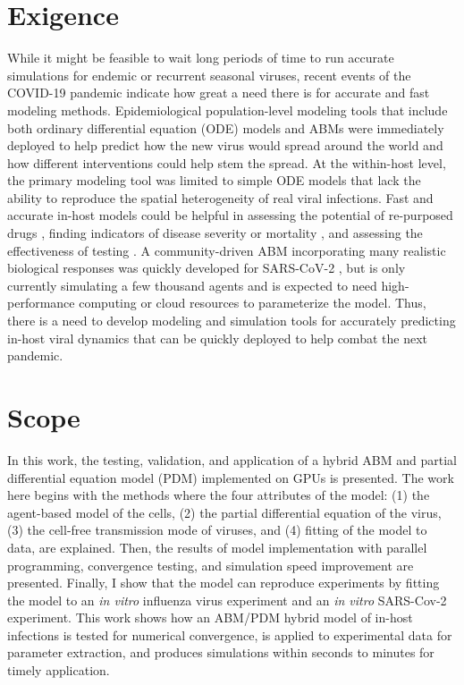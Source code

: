 \section{Exigence}
While it might be feasible to wait long periods of time to run accurate simulations for endemic or recurrent seasonal viruses, recent events of the COVID-19 pandemic indicate how great a need there is for accurate and fast modeling methods. Epidemiological population-level modeling tools that include both ordinary differential equation (ODE) models \citep{li20,ngonghala20} and ABMs \citep{ying21,sneppen21,kano21} were immediately deployed to help predict how the new virus would spread around the world and how different interventions could help stem the spread. At the within-host level, the primary modeling tool was limited to simple ODE models \citep{goncalves20,wang20model,hernandez20,dogra20} that lack the ability to reproduce the spatial heterogeneity of real viral infections. Fast and accurate in-host models could be helpful in assessing the potential of re-purposed drugs \citep{czuppon21,goncalves20,dodds20}, finding indicators of disease severity or mortality \citep{neant21}, and assessing the effectiveness of testing \citep{ejima21}. A community-driven ABM incorporating many realistic biological responses was quickly developed for SARS-CoV-2 \citep{getz21}, but is only currently simulating a few thousand agents and is expected to need high-performance computing or cloud resources to parameterize the model. Thus, there is a need to develop modeling and simulation tools for accurately predicting in-host viral dynamics that can be quickly deployed to help combat the next pandemic.

\section{Scope}

In this work, the testing, validation, and application of a hybrid ABM and partial differential equation model (PDM) implemented on GPUs is presented. The work here begins with the methods where the four attributes of the model: (1) the agent-based model of the cells, (2) the partial differential equation of the virus, (3) the cell-free transmission mode of viruses, and (4) fitting of the model to data, are explained.  Then, the results of model implementation with parallel programming, convergence testing, and simulation speed improvement are presented. Finally, I show that the model can reproduce experiments by fitting the model to an \emph{in vitro} influenza virus experiment and an \emph{in vitro} SARS-Cov-2 experiment. This work shows how an ABM/PDM hybrid model of in-host infections is tested for numerical convergence, is applied to experimental data for parameter extraction, and produces simulations within seconds to minutes for timely application.




